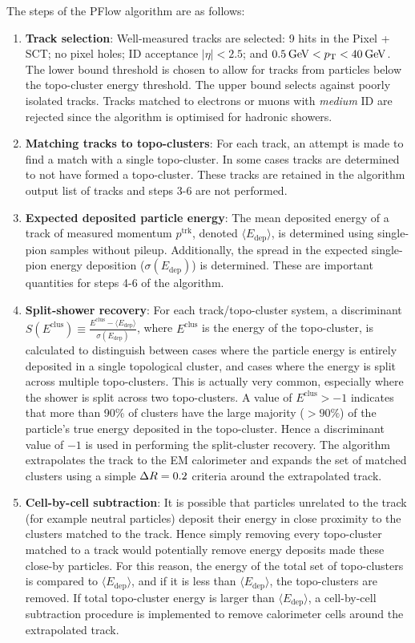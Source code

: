 The steps of the PFlow algorithm are as follows:
\begin{enumerate}
    \item \textbf{Track selection}: Well-measured tracks are selected: 9 hits in the Pixel + SCT; no pixel holes; ID acceptance $|\eta|<2.5$; and $0.5\hspace{2pt}\text{Ge\kern -0.1em V}<p_{\text{T}}<40\hspace{2pt}\text{Ge\kern -0.1em V}$. The lower bound \pt threshold is chosen to allow for tracks from particles below the topo-cluster energy threshold. The upper bound selects against poorly isolated tracks. Tracks matched to electrons or muons with \textit{medium} ID are rejected since the algorithm is optimised for hadronic showers.
    \item \textbf{Matching tracks to topo-clusters}: For each track, an attempt is made to find a match with a single topo-cluster. In some cases tracks are determined to not have formed a topo-cluster. These tracks are retained in the algorithm output list of tracks and steps 3-6 are not performed.
    \item \textbf{Expected deposited particle energy}: The mean deposited energy of a track of measured momentum $p^{\text{trk}}$, denoted $\langle E_{\text{dep}}\rangle$, is determined using single-pion samples without pileup. Additionally, the spread in the expected single-pion energy deposition ($\sigma(E_{\text{dep}})$) is determined. These are important quantities for steps 4-6 of the algorithm. 
    \item \textbf{Split-shower recovery}: For each track/topo-cluster system, a discriminant $S(E^{\text{clus}})\equiv\frac{E^{\text{clus}}-\langle E_{\text{dep}}\rangle}{\sigma(E_{\text{dep}})}$, where $E^{\text{clus}}$ is the energy of the topo-cluster, is calculated to distinguish between cases where the particle energy is entirely deposited in a single topological cluster, and cases where the energy is split across multiple topo-clusters. This is actually very common, especially where the shower is split across two topo-clusters. A value of $E^{\text{clus}}>-1$ indicates that more than 90\% of clusters have the large majority ($>90\%$) of the particle's true energy deposited in the topo-cluster. Hence a discriminant value of $-1$ is used in performing the split-cluster recovery. The algorithm extrapolates the track to the EM calorimeter and expands the set of matched clusters using a simple $\Delta R=0.2$ criteria around the extrapolated track.
    \item \textbf{Cell-by-cell subtraction}: It is possible that particles unrelated to the track (for example neutral particles) deposit their energy in close proximity to the clusters matched to the track. Hence simply removing every topo-cluster matched to a track would potentially remove energy deposits made these close-by particles. For this reason, the energy of the total set of topo-clusters is compared to $\langle E_{\text{dep}}\rangle$, and if it is less than $\langle E_{\text{dep}}\rangle$, the topo-clusters are removed. If total topo-cluster energy is larger than $\langle E_{\text{dep}}\rangle$, a cell-by-cell subtraction procedure is implemented to remove calorimeter cells around the extrapolated track.%

\end{enumerate}
